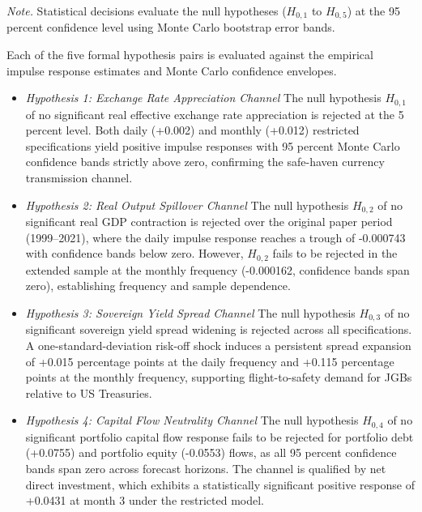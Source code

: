 \begin{center}
  \small\textit{Note.} Statistical decisions evaluate the null hypotheses ($H_{0,1}$ to $H_{0,5}$) at the 95 percent confidence level using Monte Carlo bootstrap error bands.
\end{center}

Each of the five formal hypothesis pairs is evaluated against the empirical impulse response estimates and Monte Carlo confidence envelopes.

\begin{itemize}
    \item \textit{Hypothesis 1: Exchange Rate Appreciation Channel}
\newline The null hypothesis $H_{0,1}$ of no significant real effective exchange rate appreciation is rejected at the 5 percent level. Both daily (+0.002) and monthly (+0.012) restricted specifications yield positive impulse responses with 95 percent Monte Carlo confidence bands strictly above zero, confirming the safe-haven currency transmission channel.

    \item \textit{Hypothesis 2: Real Output Spillover Channel}
\newline The null hypothesis $H_{0,2}$ of no significant real GDP contraction is rejected over the original paper period (1999--2021), where the daily impulse response reaches a trough of -0.000743 with confidence bands below zero. However, $H_{0,2}$ fails to be rejected in the extended sample at the monthly frequency (-0.000162, confidence bands span zero), establishing frequency and sample dependence.

    \item \textit{Hypothesis 3: Sovereign Yield Spread Channel}
\newline The null hypothesis $H_{0,3}$ of no significant sovereign yield spread widening is rejected across all specifications. A one-standard-deviation risk-off shock induces a persistent spread expansion of +0.015 percentage points at the daily frequency and +0.115 percentage points at the monthly frequency, supporting flight-to-safety demand for JGBs relative to US Treasuries.

    \item \textit{Hypothesis 4: Capital Flow Neutrality Channel}
\newline The null hypothesis $H_{0,4}$ of no significant portfolio capital flow response fails to be rejected for portfolio debt (+0.0755) and portfolio equity (-0.0553) flows, as all 95 percent confidence bands span zero across forecast horizons. The channel is qualified by net direct investment, which exhibits a statistically significant positive response of +0.0431 at month 3 under the restricted model.


\end{itemize}
